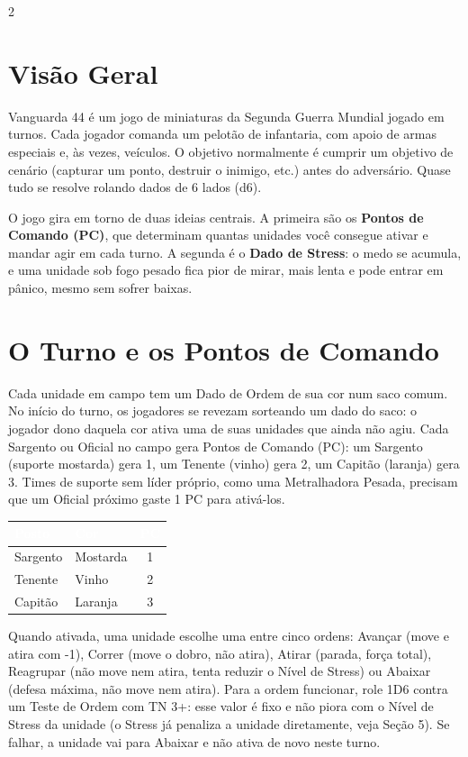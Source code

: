 \documentclass[10pt]{article}
\begin{document}
\begin{multicols}{2}

\section{Visão Geral}

Vanguarda 44 é um jogo de miniaturas da Segunda Guerra Mundial jogado em turnos. Cada jogador comanda um pelotão de infantaria, com apoio de armas especiais e, às vezes, veículos. O objetivo normalmente é cumprir um objetivo de cenário (capturar um ponto, destruir o inimigo, etc.) antes do adversário. Quase tudo se resolve rolando dados de 6 lados (d6).

O jogo gira em torno de duas ideias centrais. A primeira são os \textbf{Pontos de Comando (PC)}, que determinam quantas unidades você consegue ativar e mandar agir em cada turno. A segunda é o \textbf{Dado de Stress}: o medo se acumula, e uma unidade sob fogo pesado fica pior de mirar, mais lenta e pode entrar em pânico, mesmo sem sofrer baixas.

\section{O Turno e os Pontos de Comando}

Cada unidade em campo tem um Dado de Ordem de sua cor num saco comum. No início do turno, os jogadores se revezam sorteando um dado do saco: o jogador dono daquela cor ativa uma de suas unidades que ainda não agiu. Cada Sargento ou Oficial no campo gera Pontos de Comando (PC): um Sargento (suporte mostarda) gera 1, um Tenente (vinho) gera 2, um Capitão (laranja) gera 3. Times de suporte sem líder próprio, como uma Metralhadora Pesada, precisam que um Oficial próximo gaste 1 PC para ativá-los.

\begin{center}
\footnotesize
\setlength{\tabcolsep}{3pt}
\begin{tabular}{@{}llc@{}}
\toprule
\rowcolor{vinho}
\textcolor{white}{\textbf{Posto}} & \textcolor{white}{\textbf{Cor}} & \textcolor{white}{\textbf{PC}} \\
\midrule
Sargento & Mostarda & 1 \\
Tenente & Vinho & 2 \\
Capitão & Laranja & 3 \\
\bottomrule
\end{tabular}
\end{center}

Quando ativada, uma unidade escolhe uma entre cinco ordens: Avançar (move e atira com -1), Correr (move o dobro, não atira), Atirar (parada, força total), Reagrupar (não move nem atira, tenta reduzir o Nível de Stress) ou Abaixar (defesa máxima, não move nem atira). Para a ordem funcionar, role 1D6 contra um Teste de Ordem com TN 3+: esse valor é fixo e não piora com o Nível de Stress da unidade (o Stress já penaliza a unidade diretamente, veja Seção 5). Se falhar, a unidade vai para Abaixar e não ativa de novo neste turno.


\end{multicols}
\end{document}
